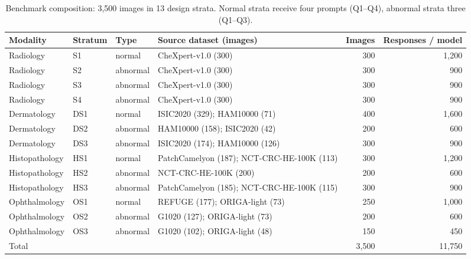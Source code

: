 \begin{table}[t]
\centering
\small
\begin{tabular}{lllp{5.2cm}rr}
\toprule
Modality & Stratum & Type & Source dataset (images) & Images & Responses / model \\
\midrule
Radiology & S1 & normal & CheXpert-v1.0 (300) & 300 & 1,200 \\
Radiology & S2 & abnormal & CheXpert-v1.0 (300) & 300 & 900 \\
Radiology & S3 & abnormal & CheXpert-v1.0 (300) & 300 & 900 \\
Radiology & S4 & abnormal & CheXpert-v1.0 (300) & 300 & 900 \\
Dermatology & DS1 & normal & ISIC2020 (329); HAM10000 (71) & 400 & 1,600 \\
Dermatology & DS2 & abnormal & HAM10000 (158); ISIC2020 (42) & 200 & 600 \\
Dermatology & DS3 & abnormal & ISIC2020 (174); HAM10000 (126) & 300 & 900 \\
Histopathology & HS1 & normal & PatchCamelyon (187); NCT-CRC-HE-100K (113) & 300 & 1,200 \\
Histopathology & HS2 & abnormal & NCT-CRC-HE-100K (200) & 200 & 600 \\
Histopathology & HS3 & abnormal & PatchCamelyon (185); NCT-CRC-HE-100K (115) & 300 & 900 \\
Ophthalmology & OS1 & normal & REFUGE (177); ORIGA-light (73) & 250 & 1,000 \\
Ophthalmology & OS2 & abnormal & G1020 (127); ORIGA-light (73) & 200 & 600 \\
Ophthalmology & OS3 & abnormal & G1020 (102); ORIGA-light (48) & 150 & 450 \\
\midrule
Total &  &  &  & 3,500 & 11,750 \\
\bottomrule
\end{tabular}
\caption{Benchmark composition: 3,500 images in 13 design strata. Normal strata receive four prompts (Q1--Q4), abnormal strata three (Q1--Q3).}
\label{tab:dataset}
\end{table}
